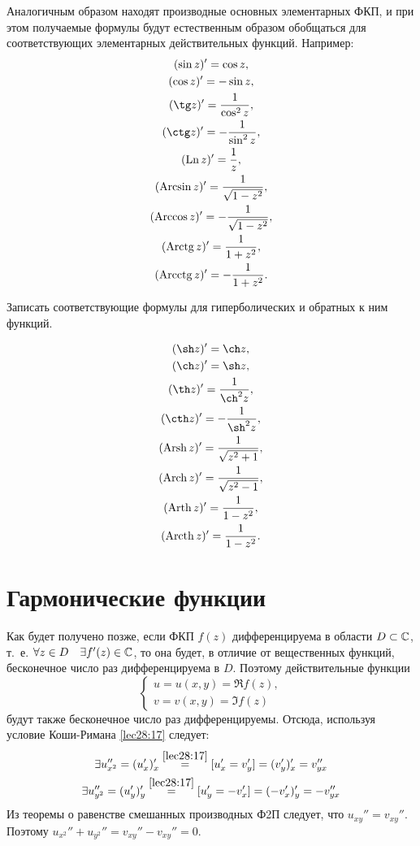 \documentclass[../../main.tex]{subfiles}
\begin{document}
Аналогичным образом находят производные основных элементарных ФКП, 
и при этом получаемые формулы будут естественным образом обобщаться для
соответствующих элементарных действительных функций. Например:
\[
\begin{gathered}
(\sin z)' = \cos z,\\ (\cos z)' = -\sin z,\\
(\tg z)' = \dfrac{1}{\cos^2 z},\\ 
(\ctg z)' = -\dfrac{1}{\sin^2 z},\\
(\Ln z)' = \dfrac{1}{z},\\
(\Arcsin z)' = \dfrac{1}{\sqrt{1 - z^2}},\\
(\Arccos z)' = -\dfrac{1}{\sqrt{1 - z^2}},\\
(\Arctg z)' = \dfrac{1}{1 + z^2},\\
(\Arcctg z)' = -\dfrac{1}{1 + z^2}.
\end{gathered}
\]
\begin{exc}
	Записать соответствующие формулы для гиперболических 
	и обратных к ним функций.
\end{exc}
\begin{eans}
\begin{gather*}
(\sh z)' = \ch z,\\
(\ch z)' = \sh z,\\
(\th z)' = \dfrac{1}{\ch^2 z},\\
(\cth z)' = -\dfrac{1}{\sh^2 z},\\
(\Arsh z)' = \dfrac{1}{\sqrt{z^2 + 1}},\\
(\Arch z)' = \dfrac{1}{\sqrt{z^2 - 1}},\\
(\Arth z)' = \dfrac{1}{1 - z^2},\\
(\Arcth z)' = \dfrac{1}{1 - z^2}.
\end{gather*}
\end{eans}

\section{Гармонические функции}

Как будет получено позже, если ФКП $ f(z) $ дифференцируема в области
$ D \subset \mathbb{C} $, т.~е. $ \forall z \in D \quad\exists f'(z) \in \mathbb{C} $, то она 
будет,
в отличие от вещественных функций, бесконечное число раз дифференцируема в $ D 
$.
Поэтому действительные функции 
\[
\begin{cases}
	u = u(x, y) = \Re f(z),\\
	v = v(x, y) = \Im f(z)
\end{cases}
\]
будут также бесконечное число раз дифференцируемы. Отсюда, используя условие
Коши-Римана \eqref{lec28:17} следует:
\[
\begin{gathered}
\exists u_{x^2}'' = (u_x')_x' 
\stackrel{\eqref{lec28:17}}{=}
[u_x' = v_y'] = (v_y')_x' = v_{yx}''\\
\exists u_{y^2}'' = (u_y')_y' 
\stackrel{\eqref{lec28:17}}{=}
[u_y' = -v_x'] = (-v_x')_y' = -v_{yx}''\\
\end{gathered}
\]
Из теоремы о равенстве смешанных производных Ф2П следует, что 
$ u_{xy}'' = v_{xy}'' $. Поэтому $ u_{x^2}'' + u_{y^2}'' = v_{xy}'' - v_{xy}'' 
= 0 $.
\end{document}
